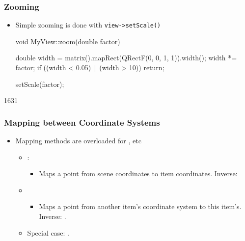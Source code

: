 \begin{slide}[fragile]

\frametitle{Zooming}
\begin{itemize}
\item Simple zooming is done with \texttt{view->setScale()}
\begin{cpp}
void MyView::zoom(double factor)
{
    double width =
        matrix().mapRect(QRectF(0, 0, 1, 1)).width();
    width *= factor;
    if ((width < 0.05) || (width > 10)) return;

    setScale(factor);
}
\end{cpp}
\end{itemize}
\end{slide}



\begin{slide}{1631}\frametitle{Mapping between Coordinate Systems}
\begin{itemize}
\item Mapping methods are overloaded for ,  etc
\begin{itemize}
\item {}:
    \begin{itemize}
    \item Maps a point from scene coordinates to item coordinates. Inverse:  
    \end{itemize}

\item {}
    \begin{itemize}
    \item Maps a point from another item's coordinate system to this item's. Inverse:  .
    \end{itemize}
\item Special case: .
\end{itemize}

\end{itemize}
\end{slide}


